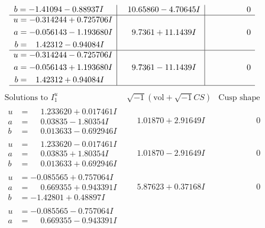 \documentclass[1p]{elsarticle_modified}
\theoremstyle{definition}
\newcommand{\I}{\sqrt{-1}}
\begin{document}
$$\begin{array}{c|c|c}
\begin{aligned}
b &= -1.41094 - 0.88937 I\end{aligned}
 & \phantom{-}10.65860 - 4.70645 I & \phantom{-0.000000 } 0 \\ \hline\begin{aligned}
u &= -0.314244 + 0.725706 I \\
a &= -0.056143 - 1.193680 I \\
b &= \phantom{-}1.42312 - 0.94084 I\end{aligned}
 & \phantom{-}9.7361 + 11.1439 I & \phantom{-0.000000 } 0 \\ \hline\begin{aligned}
u &= -0.314244 - 0.725706 I \\
a &= -0.056143 + 1.193680 I \\
b &= \phantom{-}1.42312 + 0.94084 I\end{aligned}
 & \phantom{-}9.7361 - 11.1439 I & \phantom{-0.000000 } 0\\
 \hline 
 \end{array}$$\newpage$$\begin{array}{c|c|c}  
\text{Solutions to }I^u_{1}& \I (\text{vol} + \sqrt{-1}CS) & \text{Cusp shape}\\
 \hline 
\begin{aligned}
u &= \phantom{-}1.233620 + 0.017461 I \\
a &= \phantom{-}0.03835 - 1.80354 I \\
b &= \phantom{-}0.013633 - 0.692946 I\end{aligned}
 & \phantom{-}1.01870 + 2.91649 I & \phantom{-0.000000 } 0 \\ \hline\begin{aligned}
u &= \phantom{-}1.233620 - 0.017461 I \\
a &= \phantom{-}0.03835 + 1.80354 I \\
b &= \phantom{-}0.013633 + 0.692946 I\end{aligned}
 & \phantom{-}1.01870 - 2.91649 I & \phantom{-0.000000 } 0 \\ \hline\begin{aligned}
u &= -0.085565 + 0.757064 I \\
a &= \phantom{-}0.669355 + 0.943391 I \\
b &= -1.42801 + 0.48897 I\end{aligned}
 & \phantom{-}5.87623 + 0.37168 I & \phantom{-0.000000 } 0 \\ \hline\begin{aligned}
u &= -0.085565 - 0.757064 I \\
a &= \phantom{-}0.669355 - 0.943391 I \\

\end{aligned}
\end{array}$$
\end{document}
